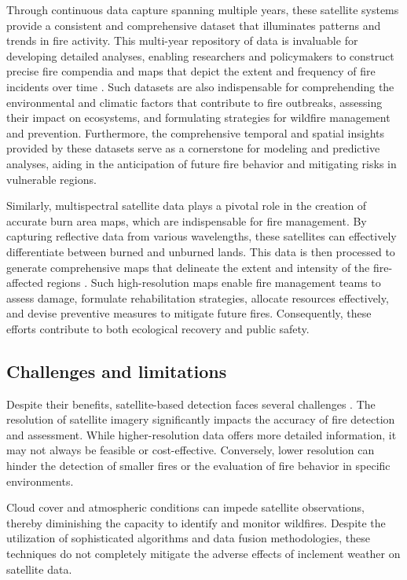 \documentclass[
  12 pt,
]{Nemilov}
\begin{document}
Through continuous data capture spanning multiple years, these satellite systems provide a consistent and comprehensive dataset that illuminates patterns and trends in fire activity. This multi-year repository of data is invaluable for developing detailed analyses, enabling researchers and policymakers to construct precise fire compendia and maps that depict the extent and frequency of fire incidents over time \citep{ankur2018generation, fire-compendium22}. Such datasets are also indispensable for comprehending the environmental and climatic factors that contribute to fire outbreaks, assessing their impact on ecosystems, and formulating strategies for wildfire management and prevention. Furthermore, the comprehensive temporal and spatial insights provided by these datasets serve as a cornerstone for modeling and predictive analyses, aiding in the anticipation of future fire behavior and mitigating risks in vulnerable regions.

Similarly, multispectral satellite data plays a pivotal role in the creation of accurate burn area maps, which are indispensable for fire management. By capturing reflective data from various wavelengths, these satellites can effectively differentiate between burned and unburned lands. This data is then processed to generate comprehensive maps that delineate the extent and intensity of the fire-affected regions \citep{burnAtlas22}. Such high-resolution maps enable fire management teams to assess damage, formulate rehabilitation strategies, allocate resources effectively, and devise preventive measures to mitigate future fires. Consequently, these efforts contribute to both ecological recovery and public safety.

\subsection{Challenges and limitations}\label{challenges-and-limitations}

Despite their benefits, satellite-based detection faces several challenges \citep{leblon2001forest}. The resolution of satellite imagery significantly impacts the accuracy of fire detection and assessment. While higher-resolution data offers more detailed information, it may not always be feasible or cost-effective. Conversely, lower resolution can hinder the detection of smaller fires or the evaluation of fire behavior in specific environments.

Cloud cover and atmospheric conditions can impede satellite observations, thereby diminishing the capacity to identify and monitor wildfires. Despite the utilization of sophisticated algorithms and data fusion methodologies, these techniques do not completely mitigate the adverse effects of inclement weather on satellite data.
\end{document}
